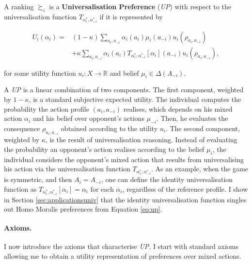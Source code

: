 \begin{definition}\label{def:up}
	A ranking \( \succsim_i \) is a \textbf{Universalisation Preference} (\textit{UP}) with respect to the universalisation function \( T_{\alpha^{*}_i, \alpha^{*}_{-i}}\) if it is represented by

	\begin{equation}\label{eq:up}
		\begin{aligned}
			U_i(\alpha_i) = {} & (1-\kappa) \sum_{a_i, a_{-i}} \alpha_i(a_i) \mu_{i}(a_{-i}) u_i(\rho_{a_i, a_{-i}})                                       \\[1mm]
			{}                 & + \kappa \sum_{a_i, a_{-i}} \alpha_i(a_i) T_{\alpha^{*}_i, \alpha^{*}_{-i}}[ \alpha_i ](a_{-i}) u_i(\rho_{a_i, a_{-i}}) ,
		\end{aligned}
	\end{equation}

	for some utility function \(u_i \colon X \rightarrow \mathbb{R}\) and belief \(\mu_i \in \Delta (A_{-i} )\).
\end{definition}

A \textit{UP} is a linear combination of two components. The first component, weighted by \( 1- \kappa \), is a standard subjective expected utility. The individual computes the probability the action profile \( ( a_i, a_{-i} ) \) realises, which depends on his mixed action \( \alpha_i \) and his belief over opponent's actions \( \mu_{-i} \). Then, he evaluates the consequence \( \rho_{a_i, a_{-i}} \) obtained according to the utility \( u_i \). The second component, weighted by \( \kappa \), is the result of universalisation reasoning. Instead of evaluating the probability an opponent's action realises according to the belief \( \mu_i \), the individual considers the opponent's mixed action that results from universalising his action via the universalisation function \( T_{\alpha^{*}_i, \alpha^{*}_{-i}} \). As an example, when the game is symmetric, and then \( A_i = A_{-i} \), one can define the identity universalisation function as \( T_{\alpha^{*}_i, \alpha^{*}_{-i}} [ \alpha_i ] = \alpha_i \) for each \( \alpha_i \), regardless of the reference profile. I show in Section \ref{sec:applicationsuniv} that the identity universalisation function singles out Homo Moralis preferences from Equation \eqref{eq:up}.

\paragraph{Axioms.} I now introduce the axioms that characterise \textit{UP}. I start with standard axioms allowing me to obtain a utility representation of preferences over mixed actions.

